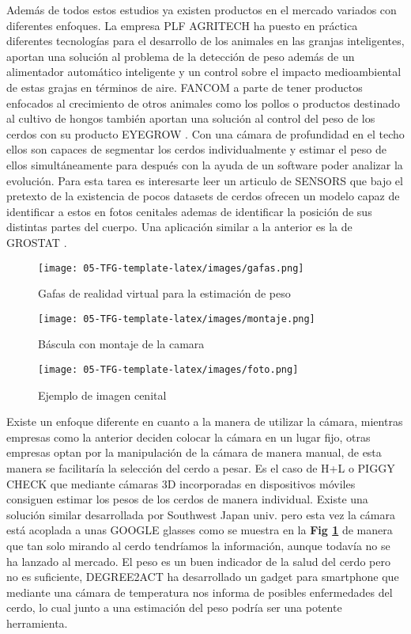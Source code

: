 \documentclass[12pt,a4paper]{article}
\begin{document}
Además de todos estos estudios ya existen productos en el mercado variados con diferentes enfoques.
La empresa PLF AGRITECH \cite{PLF} ha puesto en práctica diferentes tecnologías para el desarrollo de los animales en las granjas inteligentes, aportan una solución al problema de la detección de peso además de un alimentador automático inteligente y un control sobre el impacto medioambiental de estas grajas en términos de aire.
FANCOM \cite{fancom} a parte de tener productos enfocados al crecimiento de otros animales como los pollos o productos destinado al cultivo de hongos también aportan una solución al control del peso de los cerdos con su producto EYEGROW \cite{fancomvideo}. Con una cámara de profundidad en el techo ellos son capaces de segmentar los cerdos individualmente y estimar el peso de ellos simultáneamente para después con la ayuda de un software poder analizar la evolución. Para esta tarea es interesarte leer un articulo de SENSORS \cite{deteccion} que bajo el pretexto de la existencia de pocos datasets de cerdos ofrecen un modelo capaz de identificar a estos en fotos cenitales ademas de identificar la posición de sus distintas partes del cuerpo. Una aplicación similar a la anterior es la de GROSTAT \cite{GroStat}.
\begin{figure}[!]
\centering
\texttt{[image: 05-TFG-template-latex/images/gafas.png]}
\caption{Gafas de realidad virtual para la estimación de peso}
\label{gafas}
\end{figure}

\begin{figure}[h]
\centering
\texttt{[image: 05-TFG-template-latex/images/montaje.png]}
\caption{Báscula con montaje de la camara}
\label{montaje}
\end{figure}

\begin{figure}
\centering
\texttt{[image: 05-TFG-template-latex/images/foto.png]}
\caption{Ejemplo de imagen cenital}
\label{foto}
\end{figure}

Existe un enfoque diferente en cuanto a la manera de utilizar la cámara, mientras empresas como la anterior deciden colocar la cámara en un lugar fijo, otras empresas optan por la manipulación de la cámara de manera manual, de esta manera se facilitaría la selección del cerdo a pesar. Es el caso de H+L \cite{H+L} o PIGGY CHECK \cite{piggycheck} que mediante cámaras 3D incorporadas en dispositivos móviles consiguen estimar los pesos de los cerdos de manera individual. Existe una solución similar desarrollada por Southwest Japan univ. \cite{japon} pero esta vez la cámara está acoplada a unas GOOGLE glasses \cite{google} como se muestra en la \textbf{Fig \ref{gafas}} de manera que tan solo mirando al cerdo tendríamos la información, aunque todavía no se ha lanzado al mercado.
El peso es un buen indicador de la salud del cerdo pero no es suficiente, DEGREE2ACT \cite{degree} ha desarrollado un gadget para smartphone que mediante una cámara de temperatura nos informa de posibles enfermedades del cerdo, lo cual junto a una estimación del peso podría ser una potente herramienta.
\end{document}
